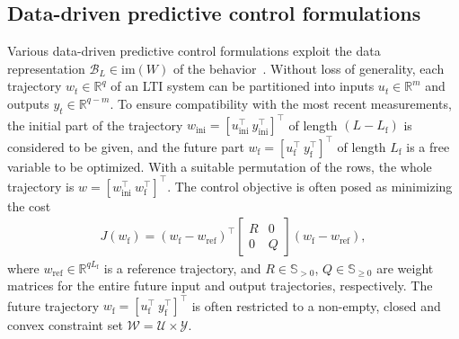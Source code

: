\documentclass[letterpaper, 10 pt, conference]{ieeeconf}
\def\wf{w_\mathrm{f}}
\def\wi{w_\mathrm{ini}}
\def\yi{y_\mathrm{ini}}
\def\ui{u_\mathrm{ini}}
\def\uf{u_\mathrm{f}}
\def\yf{y_\mathrm{f}}
\def\wr{w_\mathrm{ref}}
\begin{document}
\subsection{Data-driven predictive control formulations} \label{sec:prelim-dd-control}
Various data-driven predictive control formulations exploit the data representation $\mathcal{B}_L\in\mathrm{im}(W)$ of the behavior~\cite{coulson2019data,favoreel1999spc,breschi2023data,depersis2019formulas}.
Without loss of generality, each trajectory $w_t\in\mathbb{R}^q$ of an \gls{LTI} system can be partitioned into inputs $u_t\in\mathbb{R}^m$ and outputs $y_t\in\mathbb{R}^{q-m}$.
To ensure compatibility with the most recent measurements, the initial part of the trajectory $\wi = [\ui^\top~\yi^\top]^\top$ of length $(L - L_\mathrm{f})$ is considered to be given, and the future part $\wf = [\uf^\top~\yf^\top]^\top$ of length $L_\mathrm{f}$ is a free variable to be optimized.
With a suitable permutation of the rows, the whole trajectory is $w = [\wi^\top~\wf^\top]^\top$.
The control objective is often posed as minimizing the cost
\begin{align*}
    J(\wf) = (\wf - \wr)^\top \begin{bmatrix}R& 0 \\ 0 & Q 
    \end{bmatrix}(\wf-\wr),
\end{align*}
where $\wr\in\mathbb{R}^{qL_\mathrm{f}}$ is a reference trajectory, and $R\in\mathbb{S}_{>0}$, $Q\in\mathbb{S}_{\geq0}$ are weight matrices for the entire future input and output trajectories, respectively.
The future trajectory $\wf=[\uf^\top~\yf^\top]^\top$ is often restricted to a non-empty, closed and convex constraint set $\mathcal{W} = \mathcal{U} \times \mathcal{Y}$.
\end{document}

